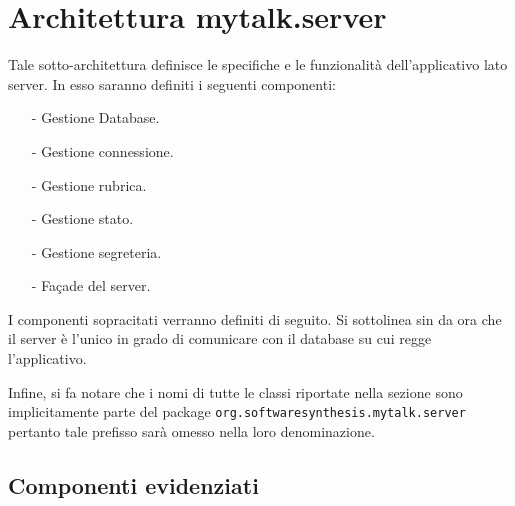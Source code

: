 \clearpage

\section{Architettura mytalk.server}
Tale sotto-architettura definisce le specifiche e le funzionalità dell'applicativo lato server. In esso saranno definiti i seguenti componenti:
\begin{itemize}[noitemsep,nolistsep]
	\item[-] Gestione Database.
	\item[-] Gestione connessione.
	\item[-] Gestione rubrica.
	\item[-] Gestione stato.
	\item[-] Gestione segreteria.
	\item[-] Façade del server.
\end{itemize}

I componenti sopracitati verranno definiti di seguito. Si sottolinea sin da ora che il server è l'unico in grado di comunicare con il database su cui regge l'applicativo.

Infine, si fa notare che i nomi di tutte le classi riportate nella sezione sono implicitamente parte del package \texttt{org.softwaresynthesis.mytalk.server} pertanto tale prefisso sarà omesso nella loro denominazione.

\subsection{Componenti evidenziati}

